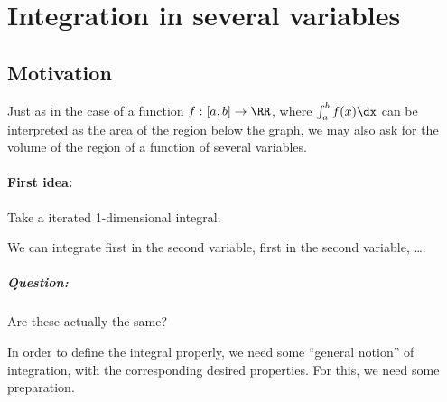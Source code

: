 \chapter{Integration in several variables}
\section{Motivation}
Just as in the case of a function $f:[a,b]\to\RR$, where $\int_{a}^{b}f(x)\dx$ can be interpreted as the area of the region below the graph, we may also ask for the volume of the region of a function of several variables. 

\subsubsection*{First idea:}
Take a iterated 1-dimensional integral. 

We can integrate first in the second variable, first in the second variable, \ldots.
\paragraph{Question:}
Are these actually the same?

In order to define the integral properly, we need some ``general notion'' of integration, with the corresponding desired properties. For this, we need some preparation. 

